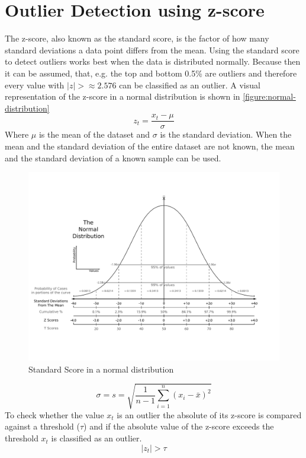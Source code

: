 \section{Outlier Detection using z-score}
\label{section:outlier-detection-z-score}
The z-score, also known as the standard score, is the factor of how many standard deviations a data point differs from the mean. Using the standard score to detect outliers works best when the data is distributed normally. Because then it can be assumed, that, e.g. the top and bottom 0.5\% are outliers and therefore every value with $|z| > \approx 2.576$ can be classified as an outlier. %
A visual representation of the z-score in a normal distribution is shown in \autoref{figure:normal-distribution}
\begin{equation}
  z_t = \frac{x_t - \mu}{\sigma}
\end{equation}
Where $\mu$ is the mean of the dataset and $\sigma$ is the standard deviation. When the mean and the standard deviation of the entire dataset are not known, the mean and the standard deviation of a known sample can be used.
\cite{DetectionSpatialOutlier, teschlSpezielleStetigeVerteilungen2014, rousseeuwAnomalyDetectionRobust2018}
\begin{figure}[H]
  \centering
  \includegraphics[width=\textwidth]{./pics/The_Normal_Distribution.pdf}
  \caption{Standard Score in a normal distribution\cite{StandardScore2022}}
  \label{figure:normal-distribution}
\end{figure}
\begin{equation}
  \sigma = s = \sqrt{\frac{1}{n-1}\sum^n_{i=1}{(x_i - \bar{x})^2}}
\end{equation}
\cite{teschlSpezielleStetigeVerteilungen2014, rousseeuwAnomalyDetectionRobust2018}\newline
To check whether the value $x_t$ is an outlier the absolute of its z-score is compared against a threshold ($\tau$) and if the absolute value of the z-score exceeds the threshold $x_t$ is classified as an outlier.
\begin{equation}
  |z_t| > \tau
\end{equation}
